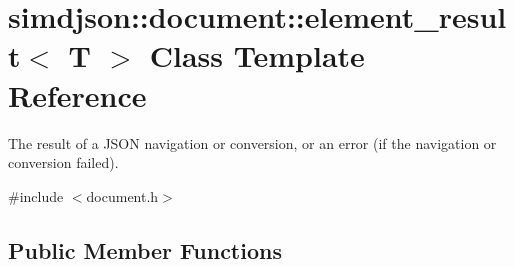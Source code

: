 \hypertarget{classsimdjson_1_1document_1_1element__result}{}\section{simdjson\+:\+:document\+:\+:element\+\_\+result$<$ T $>$ Class Template Reference}
\label{classsimdjson_1_1document_1_1element__result}


The result of a J\+S\+ON navigation or conversion, or an error (if the navigation or conversion failed).  




{\ttfamily \#include $<$document.\+h$>$}

\subsection*{Public Member Functions}
